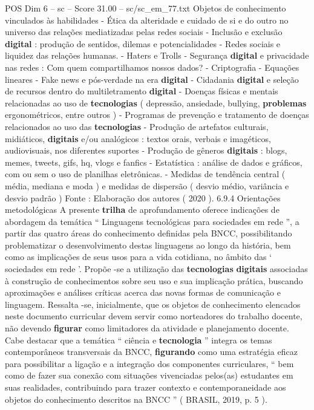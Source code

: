 \begin{textsample}{POS Dim 6 – sc – Score 31.00 – sc/sc\_em\_77.txt}
Objetos de conhecimento vinculados às habilidades - Ética da alteridade e cuidado de si e do outro no universo das relações mediatizadas pelas redes sociais - Inclusão e exclusão \textbf{digital} : produção de sentidos, dilemas e potencialidades - Redes sociais e liquidez das relações humanas. - Haters e Trolls - Segurança \textbf{digital} e privacidade nas redes : Com quem compartilhamos nossos dados? - Criptografia - Equações lineares - Fake news e pós-verdade na era \textbf{digital} - Cidadania \textbf{digital} e seleção de recursos dentro do multiletramento \textbf{digital} - Doenças físicas e mentais relacionadas ao uso de \textbf{tecnologias} ( depressão, ansiedade, bullying, \textbf{problemas} ergonométricos, entre outros ) - Programas de prevenção e tratamento de doenças relacionados ao uso das \textbf{tecnologias} - Produção de artefatos culturais, midiáticos, \textbf{digitais} e/ou analógicos : textos orais, verbais e imagéticos, audiovisuais, nos diferentes suportes - Produção de gêneros \textbf{digitais} : blogs, memes, tweets, gifs, hq, vlogs e fanfics - Estatística : análise de dados e gráficos, com ou sem o uso de planilhas eletrônicas. - Medidas de tendência central ( média, mediana e moda ) e medidas de dispersão ( desvio médio, variância e desvio padrão ) Fonte : Elaboração dos autores ( 2020 ). 6.9.4 Orientações metodológicas A presente \textbf{trilha} de aprofundamento oferece indicações de abordagem da temática “ Linguagens tecnológicas para sociedades em rede ”, a partir das quatro áreas do conhecimento definidas pela BNCC, possibilitando problematizar o desenvolvimento destas linguagens ao longo da história, bem como as implicações de seus usos para a vida cotidiana, no âmbito das ‘ sociedades em rede ’.
Propõe -se a utilização das \textbf{tecnologias} \textbf{digitais} associadas à construção de conhecimentos sobre seu uso e sua implicação prática, buscando aproximações e análises críticas acerca das novas formas de comunicação e linguagem.
Ressalta -se, inicialmente, que os objetos de conhecimento elencados neste documento curricular devem servir como norteadores do trabalho docente, não devendo \textbf{figurar} como limitadores da atividade e planejamento docente.
Cabe destacar que a temática “ ciência e \textbf{tecnologia} ” integra os temas contemporâneos transversais da BNCC, \textbf{figurando} como uma estratégia eficaz para possibilitar a ligação e a integração dos componentes curriculares, “ bem como de fazer sua conexão com situações vivenciadas pelos(as) estudantes em suas realidades, contribuindo para trazer contexto e contemporaneidade aos objetos do conhecimento descritos na BNCC ” ( BRASIL, 2019, p. 5 ).

\end{textsample}
